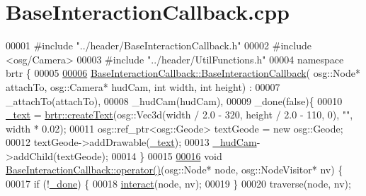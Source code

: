 \hypertarget{_base_interaction_callback_8cpp_source}{\section{Base\+Interaction\+Callback.\+cpp}
\label{_base_interaction_callback_8cpp_source}
}

\begin{DoxyCode}
00001 \textcolor{preprocessor}{#include "../header/BaseInteractionCallback.h"}
00002 \textcolor{preprocessor}{#include <osg/Camera>}
00003 \textcolor{preprocessor}{#include "../header/UtilFunctions.h"}
00004 \textcolor{keyword}{namespace }brtr \{
00005 
\hypertarget{_base_interaction_callback_8cpp_source_l00006}{}\hyperlink{classbrtr_1_1_base_interaction_callback_afc863306967933e0ebef5f7322fab06e}{00006}     \hyperlink{classbrtr_1_1_base_interaction_callback_afc863306967933e0ebef5f7322fab06e}{BaseInteractionCallback::BaseInteractionCallback}(
      osg::Node* attachTo, osg::Camera* hudCam, \textcolor{keywordtype}{int} width, \textcolor{keywordtype}{int} height) :
00007         \_attachTo(attachTo),
00008         \_hudCam(hudCam),
00009         \_done(false)\{
00010         \hyperlink{classbrtr_1_1_base_interaction_callback_af60dece4300b09fafe3c048397122cbd}{\_text} = \hyperlink{namespacebrtr_a4431de1c1fa2c1d42c4fb57c38aaa3ce}{brtr::createText}(osg::Vec3d(width / 2.0 - 320, height / 2.0 - 110, 0),
       \textcolor{stringliteral}{""}, width * 0.02);
00011         osg::ref\_ptr<osg::Geode> textGeode = \textcolor{keyword}{new} osg::Geode;
00012         textGeode->addDrawable(\hyperlink{classbrtr_1_1_base_interaction_callback_af60dece4300b09fafe3c048397122cbd}{\_text});    
00013         \hyperlink{classbrtr_1_1_base_interaction_callback_a0bca3b64724235e08740be94fe4acc8d}{\_hudCam}->addChild(textGeode);
00014     \}
00015 
\hypertarget{_base_interaction_callback_8cpp_source_l00016}{}\hyperlink{classbrtr_1_1_base_interaction_callback_ab2cf0f22fcc9e79ecda29a547edb5084}{00016}     \textcolor{keywordtype}{void} \hyperlink{classbrtr_1_1_base_interaction_callback_ab2cf0f22fcc9e79ecda29a547edb5084}{BaseInteractionCallback::operator()}(osg::Node* node, 
      osg::NodeVisitor* nv) \{
00017         \textcolor{keywordflow}{if} (!\hyperlink{classbrtr_1_1_base_interaction_callback_a2f36052886ec60a227e0734bfbc4bdbb}{\_done}) \{
00018             \hyperlink{classbrtr_1_1_base_interaction_callback_a3ed50c9c1725f932e0b78c90ba24e1ed}{interact}(node, nv);
00019         \}
00020         traverse(node, nv);

\end{DoxyCode}
